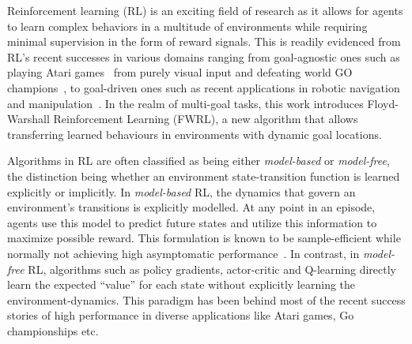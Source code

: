 Reinforcement learning (RL) is an exciting field of research as it allows for
agents to learn complex behaviors in a multitude of environments while requiring
minimal supervision in the form of reward signals. This is readily
evidenced from RL's recent successes in various domains ranging from goal-agnostic ones such as  
playing Atari games~\cite{MnKaSiNATURE2015} from purely visual input and defeating world GO
champions~\cite{gibney2016google}, to goal-driven ones such as recent
applications in robotic navigation~\cite{mirowski2018learning} and
manipulation~\cite{pong2018temporal}. In the realm of multi-goal tasks, this
work introduces Floyd-Warshall Reinforcement Learning (FWRL), a new algorithm
that allows transferring learned behaviours in environments with dynamic goal
locations.


Algorithms in RL are often classified as being either
\emph{model-based} or \emph{model-free}, the distinction being whether
an environment state-transition function is learned explicitly or
implicitly.  In \emph{model-based} RL, the dynamics that govern an
environment's transitions is explicitly modelled.
At any point in an episode, agents use this model to
predict future states and utilize this information to maximize possible
reward. This formulation is known to be sample-efficient while normally
not achieving high asymptomatic performance~\cite{pong2018temporal}.
In contrast, in \emph{model-free} RL, algorithms such as policy gradients,
actor-critic and Q-learning directly learn the expected ``value'' for each
state without explicitly learning the environment-dynamics. This paradigm has
been behind most of the recent success stories of high performance in diverse
applications like Atari games, Go championships etc.

